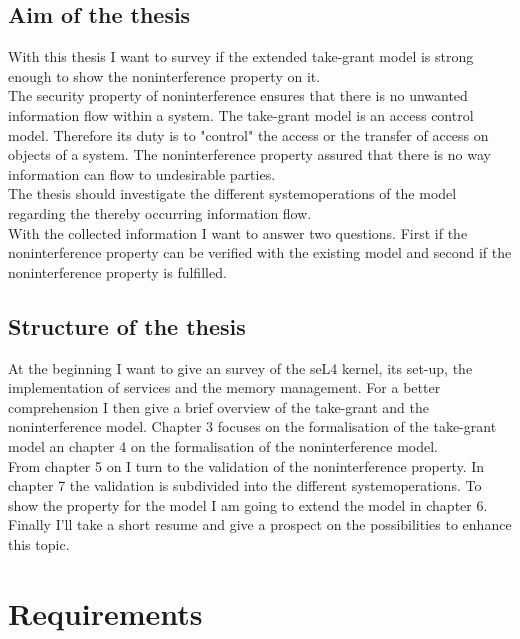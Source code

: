 \documentclass[11pt,a4paper,twoside]{article}
\begin{document}
	\subsection{Aim of the thesis}
	With this thesis I want to survey if the extended take-grant model is strong enough to show the noninterference property on it. \\
	The security property of noninterference ensures that there is no unwanted information flow within a system. The take-grant model is an access control model. Therefore its duty is to "control" the access or the transfer of access on objects of a system. The noninterference property assured that there is no way information can flow to undesirable parties. \\
The thesis should investigate the different systemoperations of the model regarding the thereby occurring information flow. \\
With the collected information I want to answer two questions. First if the noninterference property can be verified with the existing model and second if the noninterference property is fulfilled. 
\subsection{Structure of the thesis}
At the beginning I want to give an survey of the seL4 kernel, its set-up, the implementation of services and the memory management. For a better comprehension I then give a brief overview of the take-grant and the noninterference model. 
Chapter 3 focuses on the formalisation of the take-grant model an chapter 4 on the formalisation of the noninterference model. \\
From chapter 5 on I turn to the validation of the noninterference property. In chapter 7 the validation is subdivided into the different systemoperations. To show the property for the model I am going to extend the model in chapter 6. \\
Finally I'll take a short resume and give a prospect on the possibilities to enhance this topic. 
\newpage
	\section{Requirements}
\end{document}
